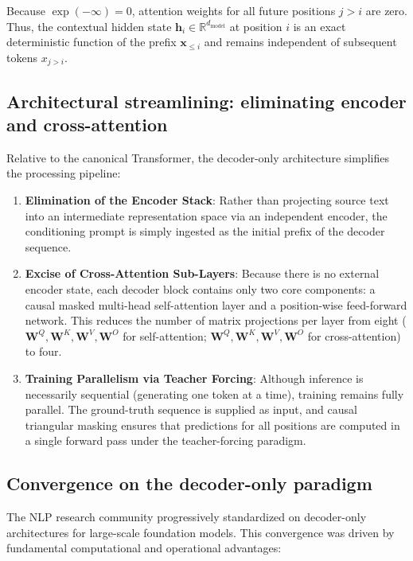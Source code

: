 \documentclass[../../main.tex]{subfiles}
\begin{document}
Because $\exp(-\infty) = 0$, attention weights for all future positions $j > i$ are zero. Thus, the contextual hidden state $\mathbf{h}_i \in \mathbb{R}^{d_{\text{model}}}$ at position $i$ is an exact deterministic function of the prefix $\mathbf{x}_{\le i}$ and remains independent of subsequent tokens $x_{j > i}$.


\subsection{Architectural streamlining: eliminating encoder and cross-attention}
\label{subsec:decoder_streamlining}

Relative to the canonical Transformer, the decoder-only architecture simplifies the processing pipeline:

\begin{enumerate}
    \item \textbf{Elimination of the Encoder Stack}: Rather than projecting source text into an intermediate representation space via an independent encoder, the conditioning prompt is simply ingested as the initial prefix of the decoder sequence.
    \item \textbf{Excise of Cross-Attention Sub-Layers}: Because there is no external encoder state, each decoder block contains only two core components: a causal masked multi-head self-attention layer and a position-wise feed-forward network. This reduces the number of matrix projections per layer from eight ($\mathbf{W}^Q, \mathbf{W}^K, \mathbf{W}^V, \mathbf{W}^O$ for self-attention; $\mathbf{W}^Q, \mathbf{W}^K, \mathbf{W}^V, \mathbf{W}^O$ for cross-attention) to four.
    \item \textbf{Training Parallelism via Teacher Forcing}: Although inference is necessarily sequential (generating one token at a time), training remains fully parallel. The ground-truth sequence is supplied as input, and causal triangular masking ensures that predictions for all positions are computed in a single forward pass under the teacher-forcing paradigm.
\end{enumerate}


\subsection{Convergence on the decoder-only paradigm}
\label{subsec:decoder_only_dominance}

The NLP research community progressively standardized on decoder-only architectures for large-scale foundation models. This convergence was driven by fundamental computational and operational advantages:
\end{document}
